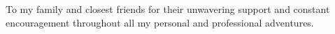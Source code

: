 \begingroup
\patchcmd{\chapter}{\thispagestyle{plain}}{\thispagestyle{empty}}{}{}
\chapter*{} %
\endgroup


\begin{center}
     To my family and closest friends for their unwavering support and constant encouragement throughout all my personal and professional adventures.
\end{center}